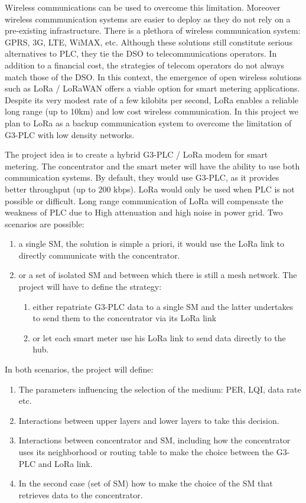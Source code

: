 \documentclass[a4paper,10pt]{article}
\begin{document}
Wireless communications can be used to overcome this
limitation. Moreover wireless commmunication systems are
easier to deploy as they do not rely on a pre-existing
infrastructure. There is a plethora of wireless
communication system: GPRS, 3G, LTE, WiMAX, etc. Although
these solutions still constitute serious alternatives to
PLC, they tie the DSO to telecommunications operators. In
addition to a financial cost, the strategies of telecom
operators do not always match those of the DSO. In this
context, the emergence of open wireless solutions such as
LoRa / LoRaWAN offers a viable option for smart metering
applications. Despite its very modest rate of a few kilobits
per second, LoRa enables a reliable long range (up to 10km)
and low cost wireless communication. In this project we plan
to LoRa as a backup communication system to overcome the
limitation of G3-PLC with low density networks.

The project idea is to create a hybrid G3-PLC / LoRa modem
for smart metering. The concentrator and the smart meter
will have the ability to use both communication systems. By
default, they would use G3-PLC, as it provides better
throughput (up to 200 kbps). LoRa would only be used when
PLC is not possible or difficult. Long range communication
of LoRa will compensate the weakness of PLC due to High
attenuation and high noise in power grid. Two scenarios are
possible:

\begin{enumerate}
  \item a single SM, the solution is simple a priori, it would use the LoRa link to directly communicate with the concentrator.
  \item or a set of isolated SM and between which there is still a mesh network. The project will have to define the strategy:
    \begin{enumerate}
      \item either repatriate G3-PLC data to a single SM and the latter undertakes to send them to the concentrator via its LoRa link
      \item or let each smart meter use his LoRa link to send data directly to the hub.
    \end{enumerate}
\end{enumerate}

In both scenarios, the project will define:

\begin{enumerate}
\item The parameters influencing the selection of the medium: PER, LQI, data rate etc.
\item Interactions between upper layers and lower layers to take this decision.
\item Interactions between concentrator and SM, including how the concentrator uses its neighborhood or routing table to make the choice between the G3-PLC and LoRa link.
\item In the second case (set of SM) how to make the choice of the SM that retrieves data to the concentrator.
\end{enumerate}
\end{document}
